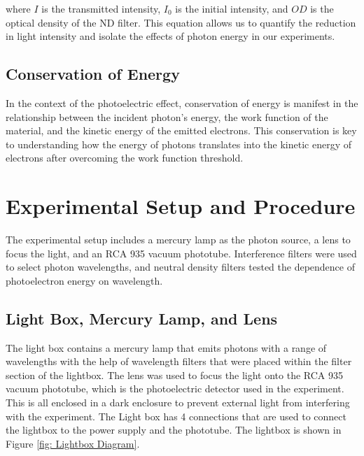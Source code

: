 \documentclass[12pt]{article}
\begin{document}
where \( I \) is the transmitted intensity, \( I_0 \) is the initial intensity, and \( OD \) is the optical density
of the ND filter. This equation allows us to quantify the reduction in light intensity and isolate the effects of
photon energy in our experiments.

\subsection{Conservation of Energy}
In the context of the photoelectric effect, conservation of energy is manifest in the relationship between the incident 
photon's energy, the work function of the material, and the kinetic energy of the emitted electrons. This conservation is 
key to understanding how the energy of photons translates into the kinetic energy of electrons after overcoming the work 
function threshold.

\section{Experimental Setup and Procedure}
        The experimental setup includes a mercury lamp as the photon source, a lens to focus the light, and an 
        RCA 935 vacuum phototube. Interference filters were used to select photon wavelengths, and neutral density 
        filters tested the dependence of photoelectron energy on wavelength.

        \subsection{Light Box, Mercury Lamp, and Lens}
        The light box contains a mercury lamp that emits photons with a range of wavelengths with the help of wavelength 
        filters that were placed within the filter section of the lightbox. The lens was used to focus the light onto the
        RCA 935 vacuum phototube, which is the photoelectric detector used in the experiment. This is all enclosed in a dark
        enclosure to prevent external light from interfering with the experiment. The Light box has 4 connections
        that are used to connect the lightbox to the power supply and the phototube. The lightbox is shown in Figure \ref{fig: Lightbox Diagram}.
\end{document}
